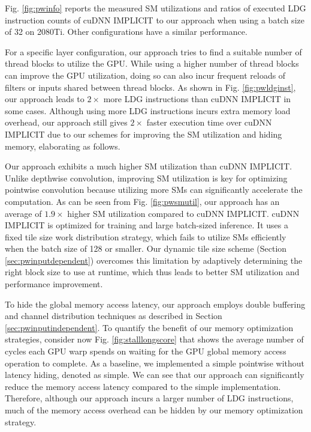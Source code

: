 Fig. \ref{fig:pwinfo} reports the measured SM utilizations and ratios of executed LDG instruction counts of cuDNN IMPLICIT to our approach when using a batch size of 32 on 2080Ti. Other configurations have a similar performance.


For a specific layer configuration, our approach tries to find a suitable number of thread blocks to utilize the GPU. While using a higher
number of thread blocks can improve the GPU utilization, doing so can also incur frequent reloads of filters or inputs shared between
thread blocks. As shown in Fig. \ref{fig:pwldginst}, our approach leads to $2\times$ more LDG instructions than cuDNN IMPLICIT in some
cases. Although using more LDG instructions incurs extra memory load overhead, our approach still gives $2\times$ faster execution time
over cuDNN IMPLICIT due to our schemes for improving the SM utilization and hiding memory, elaborating as follows.


Our approach exhibits a much higher SM utilization than cuDNN IMPLICIT. Unlike depthwise convolution, improving SM utilization is key for
optimizing pointwise convolution because utilizing more SMs can significantly accelerate the computation.	As can be seen from Fig.
\ref{fig:pwsmutil}, our approach has an average of $1.9\times$ higher SM utilization compared to cuDNN IMPLICIT. cuDNN IMPLICIT is
optimized for training and large batch-sized inference. It uses a fixed tile size work distribution strategy, which fails to utilize SMs
efficiently when the batch size of 128 or smaller. Our dynamic tile size scheme (Section \ref{sec:pwinputdependent}) overcomes this
limitation by adaptively determining the right block size to use at runtime, which thus leads to better SM utilization and performance
improvement.

To hide the global memory access latency, our approach employs double buffering and channel distribution techniques as described in
Section \ref{sec:pwinputindependent}. To quantify the benefit of our memory optimization strategies, consider now  Fig. \ref{fig:stalllongscore} that
shows the average number of cycles each GPU warp spends on waiting for the GPU global memory access operation to complete. As a baseline,
we implemented a simple pointwise without latency hiding, denoted as simple. We can see that our approach can significantly reduce the
memory access latency compared to the simple implementation. Therefore, although our approach incurs a larger number of LDG instructions,
much of the memory access overhead can be hidden by our memory optimization strategy.



